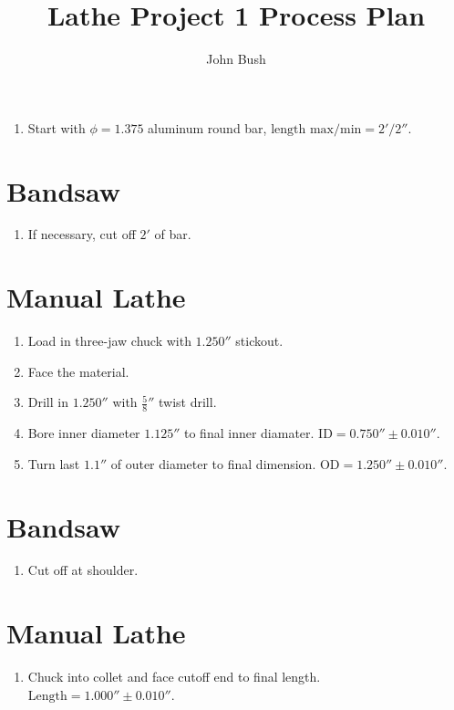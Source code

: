 \documentclass{article}
\begin{document}
\title{Lathe Project 1 Process Plan}
\author{John Bush}


\maketitle

\begin{enumerate}
	\item Start with $\phi = 1.375$ aluminum round bar, $\text{length max/min} = 2' / 2''$.
\end{enumerate}

\section*{Bandsaw}

\begin{enumerate}[resume]
	\item If necessary, cut off $2'$ of bar.
\end{enumerate}

\section*{Manual Lathe}

\begin{enumerate}[resume]
	\item Load in three-jaw chuck with $1.250''$ stickout.
	
	\item Face the material.

	\item Drill in $1.250''$ with $\frac{5}{8} ''$ twist drill.

	\item Bore inner diameter $1.125''$ to final inner diamater. $\text{ID} = 0.750'' \pm 0.010''$.
	
	\item Turn last $1.1''$ of outer diameter to final dimension.  $\text{OD} = 1.250'' \pm 0.010''$.

\end{enumerate}

\section*{Bandsaw}

\begin{enumerate}[resume]
	\item Cut off at shoulder.
\end{enumerate}

\section*{Manual Lathe}

\begin{enumerate}[resume]
	\item Chuck into collet and face cutoff end to final length. $\text{Length} = 1.000'' \pm 0.010''$.
\end{enumerate}
\end{document}
